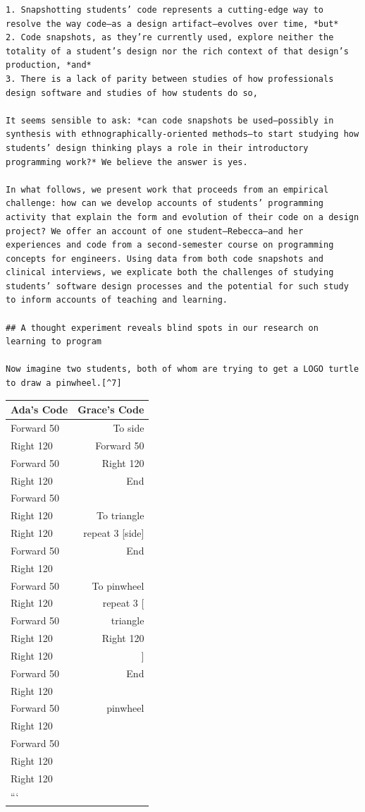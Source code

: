 \begin{verbatim}
1. Snapshotting students’ code represents a cutting-edge way to resolve the way code—as a design artifact—evolves over time, *but*
2. Code snapshots, as they’re currently used, explore neither the totality of a student’s design nor the rich context of that design’s production, *and*
3. There is a lack of parity between studies of how professionals design software and studies of how students do so,

It seems sensible to ask: *can code snapshots be used—possibly in synthesis with ethnographically-oriented methods—to start studying how students’ design thinking plays a role in their introductory programming work?* We believe the answer is yes.

In what follows, we present work that proceeds from an empirical challenge: how can we develop accounts of students’ programming activity that explain the form and evolution of their code on a design project? We offer an account of one student—Rebecca—and her experiences and code from a second-semester course on programming concepts for engineers. Using data from both code snapshots and clinical interviews, we explicate both the challenges of studying students’ software design processes and the potential for such study to inform accounts of teaching and learning.

## A thought experiment reveals blind spots in our research on learning to program

Now imagine two students, both of whom are trying to get a LOGO turtle to draw a pinwheel.[^7]
\end{verbatim}

\begin{longtable}[]{@{}lr@{}}
\toprule
Ada's Code & Grace's Code\tabularnewline
\midrule
\endhead
Forward 50 & To side\tabularnewline
Right 120 & Forward 50\tabularnewline
Forward 50 & Right 120\tabularnewline
Right 120 & End\tabularnewline
Forward 50 &\tabularnewline
Right 120 & To triangle\tabularnewline
Right 120 & repeat 3 {[}side{]}\tabularnewline
Forward 50 & End\tabularnewline
Right 120 &\tabularnewline
Forward 50 & To pinwheel\tabularnewline
Right 120 & repeat 3 {[}\tabularnewline
Forward 50 & triangle\tabularnewline
Right 120 & Right 120\tabularnewline
Right 120 & {]}\tabularnewline
Forward 50 & End\tabularnewline
Right 120 &\tabularnewline
Forward 50 & pinwheel\tabularnewline
Right 120 &\tabularnewline
Forward 50 &\tabularnewline
Right 120 &\tabularnewline
Right 120 &\tabularnewline
``` &\tabularnewline
\bottomrule
\end{longtable}

